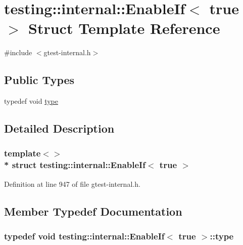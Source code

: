 \hypertarget{structtesting_1_1internal_1_1_enable_if_3_01true_01_4}{}\section{testing\+:\+:internal\+:\+:Enable\+If$<$ true $>$ Struct Template Reference}
\label{structtesting_1_1internal_1_1_enable_if_3_01true_01_4}


{\ttfamily \#include $<$gtest-\/internal.\+h$>$}

\subsection*{Public Types}
\begin{DoxyCompactItemize}
\item 
typedef void \hyperlink{structtesting_1_1internal_1_1_enable_if_3_01true_01_4_a9398d803f1fdd99ff41823746f6299ff}{type}
\end{DoxyCompactItemize}


\subsection{Detailed Description}
\subsubsection*{template$<$$>$\\*
struct testing\+::internal\+::\+Enable\+If$<$ true $>$}



Definition at line 947 of file gtest-\/internal.\+h.



\subsection{Member Typedef Documentation}
\subsubsection[{\texorpdfstring{type}{type}}]{\setlength{\rightskip}{0pt plus 5cm}typedef void {\bf testing\+::internal\+::\+Enable\+If}$<$ true $>$\+::{\bf type}}\hypertarget{structtesting_1_1internal_1_1_enable_if_3_01true_01_4_a9398d803f1fdd99ff41823746f6299ff}{}\label{structtesting_1_1internal_1_1_enable_if_3_01true_01_4_a9398d803f1fdd99ff41823746f6299ff}


